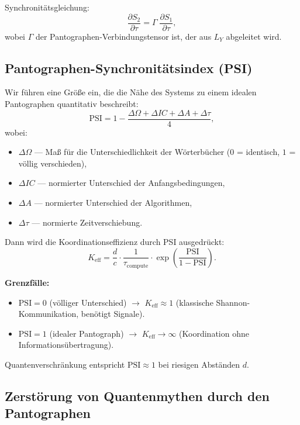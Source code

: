 \documentclass[12pt,a4paper]{article}
\begin{document}
	Synchronitätsgleichung:
	\[
	\frac{\partial S_2}{\partial \tau} = \Gamma \; \frac{\partial S_1}{\partial \tau},
	\]
	wobei \(\Gamma\) der Pantographen-Verbindungstensor ist, der aus \(L_Y\) abgeleitet wird.
	
	\subsection{Pantographen-Synchronitätsindex (PSI)}
	
	Wir führen eine Größe ein, die die Nähe des Systems zu einem idealen Pantographen quantitativ beschreibt:
	\[
	\mathrm{PSI} = 1 - \frac{\Delta\Omega + \Delta IC + \Delta A + \Delta\tau}{4},
	\]
	wobei:
	\begin{itemize}
		\item \(\Delta\Omega\) — Maß für die Unterschiedlichkeit der Wörterbücher (\(0\) = identisch, \(1\) = völlig verschieden),
		\item \(\Delta IC\) — normierter Unterschied der Anfangsbedingungen,
		\item \(\Delta A\) — normierter Unterschied der Algorithmen,
		\item \(\Delta\tau\) — normierte Zeitverschiebung.
	\end{itemize}
	
	Dann wird die Koordinationseffizienz durch PSI ausgedrückt:
	\[
	K_{\mathrm{eff}} = \frac{d}{c} \cdot \frac{1}{\tau_{\mathrm{compute}}} \cdot \exp\!\left( \frac{\mathrm{PSI}}{1 - \mathrm{PSI}} \right).
	\]
	
	\textbf{Grenzfälle:}
	\begin{itemize}
		\item \(\mathrm{PSI} = 0\) (völliger Unterschied) \(\to\) \(K_{\mathrm{eff}} \approx 1\) (klassische Shannon-Kommunikation, benötigt Signale).
		\item \(\mathrm{PSI} = 1\) (idealer Pantograph) \(\to\) \(K_{\mathrm{eff}} \to \infty\) (Koordination ohne Informationsübertragung).
	\end{itemize}
	Quantenverschränkung entspricht \(\mathrm{PSI} \approx 1\) bei riesigen Abständen \(d\).
	
	\subsection{Zerstörung von Quantenmythen durch den Pantographen}
	
\end{document}
